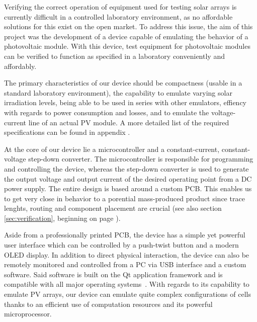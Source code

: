 
Verifying the correct operation of equipment  used for testing solar arrays is
currently difficult in  a controlled laboratory environment,  as no affordable
solutions for this exist on the open market. To address this issue, the aim of
this project was the development of a device capable of emulating the behavior
of a  photovoltaic module. With this  device, test equipment  for photovoltaic
modules can be verified to function  as specified in a laboratory conveniently
and affordably.

The primary characteristics  of our device should be compactness  (usable in a
standard  laboratory environment),  the  capability to  emulate varying  solar
irradiation levels,  being able  to be  used in  series with  other emulators,
effiency with  regards to  power consumption  and losses,  and to  emulate the
voltage-current  line  of  an  actual  PV  module. A  more  detailed  list  of
the  required specifications  can  be  found in  appendix  . %

At  the core  of  our device  lie a  microcontroller  and a  constant-current,
constant-voltage step-down converter.  The  microcontroller is responsible for
programming and  controlling the  device, whereas  the step-down  converter is
used  to  generate the  output  voltage  and  output  current of  the  desired
operating point  from a DC power  supply. The entire design is  based around a
custom  PCB. This enables  us to  get very  close in  behavior to  a porential
mass-produced  product since  trace lenghts,  routing and  component placement
are  crucial  (see  also  section \ref{sec:verification},  beginning  on  page
\pageref{sec:verification}).

Aside from a professionally printed PCB,  the device has a simple yet powerful
user interface  which can be  controlled by a  push-twist button and  a modern
OLED display. In addition to direct  physical interaction, the device can also
be remotely monitored and controlled from a  PC via USB interface and a custom
software. Said  software is  built  on  the Qt  application  framework and  is
compatible with all major operating systems~\cite{ref:qt}. With regards to its
capability  to  emulate  PV  arrays,  our device  can  emulate  quite  complex
configurations of  cells thanks to  an efficient use of  computation resources
and its powerful microprocessor.


